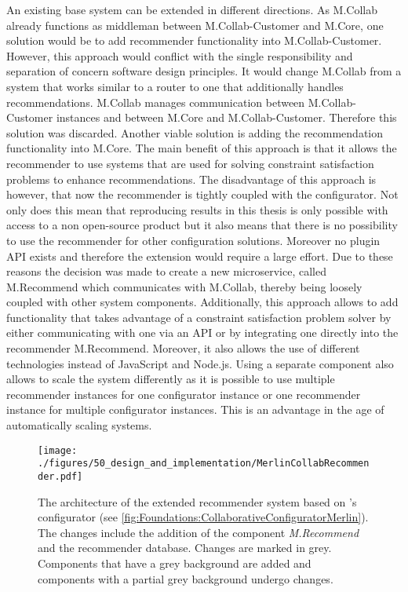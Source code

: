 An existing base system can be extended in different directions. As M.Collab already functions as middleman between M.Collab-Customer and M.Core, one solution would be to add recommender functionality into M.Collab-Customer. However, this approach would conflict with the single responsibility and separation of concern software design principles. It would change M.Collab from a system that works similar to a router to one that additionally handles  recommendations. M.Collab manages communication between M.Collab-Customer instances and between M.Core and M.Collab-Customer. Therefore this solution was discarded.
Another viable solution is adding the recommendation functionality into M.Core. The main benefit of this approach is that it allows the recommender to use systems that are used for solving constraint satisfaction problems to enhance recommendations. The disadvantage of this approach is however, that now the recommender is tightly coupled with the configurator. Not only does this mean that reproducing results in this thesis is only possible with access to a non open-source product but it also means that there is no possibility to use the recommender for other configuration solutions. Moreover no plugin API exists and therefore the extension would require a large effort. 
Due to these reasons the decision was made to create a new microservice, called M.Recommend which communicates with M.Collab, thereby being loosely coupled with other system components. Additionally, this approach allows to add functionality that takes  advantage of a constraint satisfaction problem solver by either communicating with one via an API or by integrating one directly into the recommender M.Recommend. Moreover, it also allows the use of different technologies instead of JavaScript and Node.js. Using a separate component also allows to scale the system differently as it is possible to use multiple recommender instances for one configurator instance or one recommender instance for multiple configurator instances. This is an advantage in the age of automatically scaling systems.

\begin{figure}
    \centering
    \texttt{[image: ./figures/50\_design\_and\_implementation/MerlinCollabRecommender.pdf]}
    \caption{The architecture of the extended recommender system based on \cite[Fig. 4.3]{raabKollaborativeProduktkonfigurationEchtzeit2019}'s configurator (see \autoref{fig:Foundations:CollaborativeConfiguratorMerlin}). The changes include the addition of the component \emph{M.Recommend} and the recommender database. Changes are marked in grey. Components that have a grey background are added and components with a partial grey background undergo changes.}
    \label{fig:DesignImplementation:RecommenderForCollaborativeConfiguratorMerlin}
\end{figure}

